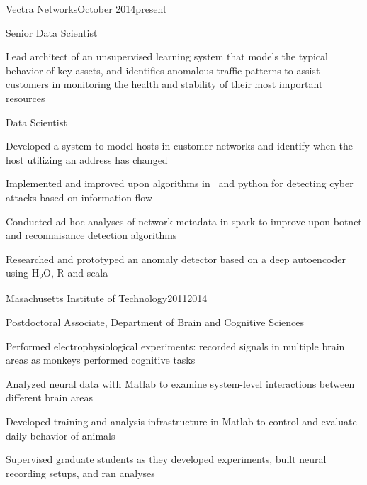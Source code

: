 \documentclass{report}
\begin{document}
  \begin{work_location}{Vectra Networks}{October 2014}{present}

    \begin{position}{Senior Data Scientist}
      \item Lead architect of an unsupervised learning system that models the typical behavior of key assets, and identifies anomalous traffic patterns to assist customers in monitoring the health and stability of their most important resources
    \end{position}

    \vspace{.5mm}

    \begin{position}{Data Scientist}
      \item Developed a system to model hosts in customer networks and identify when the host utilizing an address has changed
      \item Implemented and improved upon algorithms in \CC~and python for detecting cyber attacks based on information flow
      \item Conducted ad-hoc analyses of network metadata in spark to improve upon botnet and reconnaisance detection algorithms
      \item Researched and prototyped an anomaly detector based on a deep autoencoder using H\textsubscript{2}O, R and scala
    \end{position}

  \end{work_location}



  \begin{work_location}{Masachusetts Institute of Technology}{2011}{2014}

    \begin{position}{Postdoctoral Associate, Department of Brain and Cognitive Sciences}
      \item {} Performed electrophysiological experiments: recorded signals in multiple brain areas as monkeys performed cognitive tasks
      \item Analyzed neural data with Matlab to examine system-level interactions between different brain areas
      \item Developed training and analysis infrastructure in Matlab to control and evaluate daily behavior of animals
      \item Supervised graduate students as they developed experiments, built neural recording setups, and ran analyses
    \end{position}

  \end{work_location}
\end{document}
